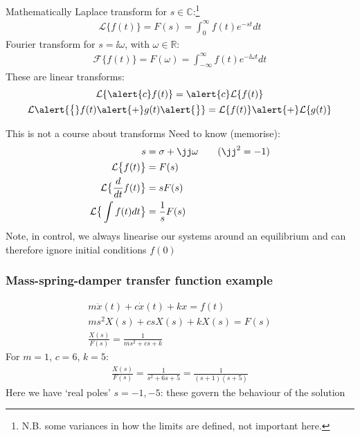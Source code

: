 \documentclass{beamer-control}
\begin{document}

\begin{frame}{Mathematically}
  Laplace transform for $s\in\mathbb{C}$:\footnote{N.B. some variances in how the limits are defined, not important here.}
  \begin{gather}
  \mathcal{L}\{f(t)\} = F(s) = \int_0^\infty f(t) e^{-st} dt
  \end{gather}
  Fourier transform for $s=\ii\omega$, with $\omega\in\mathbb{R}$:
  \begin{gather}
  \mathcal{F}\{f(t)\} = F(\omega) = \int_{-\infty}^\infty f(t) e^{-\ii\omega t} dt
  \end{gather}
  These are linear transforms:
  \begin{gather}
  \mathcal{L}\{\alert{c} f(t)\} = \alert{c}\mathcal{L}\{f(t)\} \\
  \mathcal{L}\alert{\bigl\{}f(t)\alert{+}g(t)\alert{\bigr\}} = \mathcal{L}\{f(t)\}\alert{+}\mathcal{L}\{g(t)\}
  \end{gather}
\end{frame}


\begin{frame}{This is not a course about transforms}
  Need to know (memorise):
  \begin{align}
  s &= \sigma+\jj\ww \qquad (\jj^2=-1) \\
  \mathcal{L}\bigl\{f(t)\bigr\} &= F(s) \\
  \mathcal{L}\bigl\{\frac{d}{dt}f(t)\bigr\} &= sF(s)  \\
  \mathcal{L}\bigr\{\int f(t)dt\bigr\} &= \frac{1}{s}F(s)
  \end{align}
  Note, in control, we always linearise our systems around an equilibrium and can therefore ignore initial conditions $f(0)$
\end{frame}

\begin{frame}
\frametitle{Mass-spring-damper transfer function example}
\begin{gather}
m \ddot x(t) + c \dot x(t) + kx = f(t) \\
m s^2 X(s) + c s X(s) + k X(s) = F(s) \\
\frac{X(s)}{F(s)} = \frac{1}{ms^2+cs+k}
\end{gather}
For $m=1$, $c=6$, $k=5$:
  \begin{gather}
\frac{X(s)}{F(s)} = \frac{1}{s^2+6s+5} = \frac{1}{(s+1)(s+5)}
  \end{gather}
Here we have `real poles' $s=-1, -5$: these govern the behaviour of the solution
\end{frame}
\end{document}
